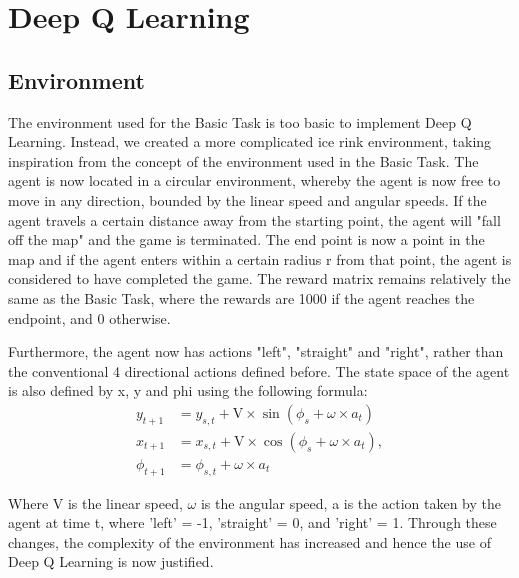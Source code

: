 \renewcommand{\thesection}{Advanced Task}
\section{Deep Q Learning}
\subsection{Environment}
The environment used for the Basic Task is too basic to implement Deep Q Learning. Instead, we created a more complicated ice rink environment, taking inspiration from the concept of the environment used in the Basic Task. The agent is now located in a circular environment, whereby the agent is now free to move in any direction, bounded by the linear speed and angular speeds.  If the agent travels a certain distance away from the starting point, the agent will "fall off the map" and the game is terminated. The end point is now a point in the map and if the agent enters within a certain radius r from that point, the agent is considered to have completed the game. The reward matrix remains relatively the same as the Basic Task, where the rewards are 1000 if the agent reaches the endpoint, and 0 otherwise.

Furthermore, the agent now has actions "left", "straight" and "right", rather than the conventional 4 directional actions defined before. The state space of the agent is also defined by x, y and phi using the following formula:
\begin{align}
    y_{t+1} &= y_{s,t} + \text{V} \times \sin(\phi_s + \omega \times a_t) \label{something} \\
    x_{t+1} &= x_{s,t} + \text{V} \times \cos(\phi_s + \omega \times a_t), \\
    \phi_{t+1} &= \phi_{s,t} + \omega \times a_t
\end{align}

Where V is the linear speed, $\omega$ is the angular speed, a is the action taken by the agent at time t, where 'left' = -1, 'straight' = 0, and 'right' = 1. Through these changes, the complexity of the environment has increased and hence the use of Deep Q Learning is now justified.

